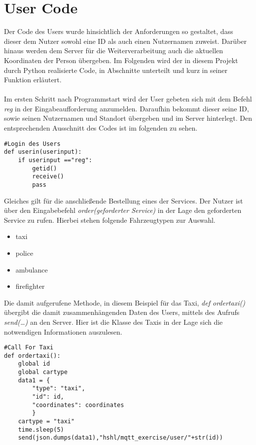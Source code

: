 \documentclass[conference]{IEEEtran}
\begin{document}
\lstset{language=Python}

\section{User Code}\label{usercode}
Der Code des Users wurde hinsichtlich der Anforderungen so gestaltet, dass dieser dem Nutzer sowohl eine ID als auch einen Nutzernamen zuweist. Darüber hinaus werden dem Server für die Weiterverarbeitung auch die aktuellen Koordinaten der Person übergeben. Im Folgenden wird der in diesem Projekt durch Python realisierte Code, in Abschnitte unterteilt und kurz in seiner Funktion erläutert.\\
\\
Im ersten Schritt nach Programmstart wird der User gebeten sich mit dem Befehl \textit{reg} in der Eingabeaufforderung anzumelden. Daraufhin bekommt dieser seine ID, sowie seinen Nutzernamen und Standort übergeben und im Server hinterlegt. Den entsprechenden Ausschnitt des Codes ist im folgenden zu sehen.

\begin{lstlisting}
#Login des Users
def userin(userinput):
    if userinput =="reg":
        getid()
        receive()
        pass
\end{lstlisting}

Gleiches gilt für die anschließende Bestellung eines der Services. Der Nutzer ist über den Eingabebefehl \textit{order(geforderter Service)} in der Lage den geforderten Service zu rufen. Hierbei stehen folgende Fahrzeugtypen zur Auswahl.

\begin{itemize}

	\item taxi
	\item police
	\item ambulance
	\item firefighter

\end{itemize}

Die damit aufgerufene Methode, in diesem Beispiel für das Taxi, \textit{def ordertaxi()} übergibt die damit zusammenhängenden Daten des Users, mittels des Aufrufs \textit{send(…)} an den Server.
Hier ist die Klasse des Taxis in der Lage sich die notwendigen Informationen auszulesen.

\begin{lstlisting}
#Call For Taxi
def ordertaxi():
    global id
    global cartype
    data1 = {
        "type": "taxi",
        "id": id,
        "coordinates": coordinates
        }
    cartype = "taxi"
    time.sleep(5)
    send(json.dumps(data1),"hshl/mqtt_exercise/user/"+str(id))
\end{lstlisting}
\end{document}
